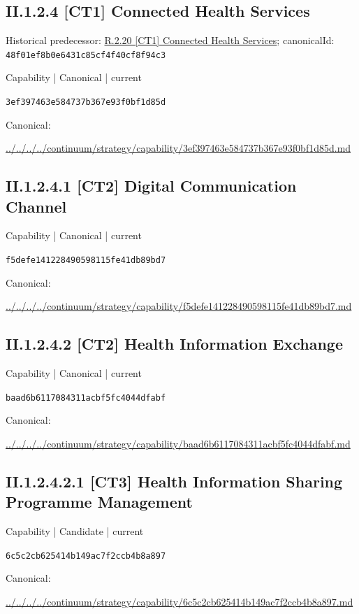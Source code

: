 \documentclass[10pt,a4paper]{article}
\begin{document}
\subsection*{II.1.2.4 [CT1] Connected Health Services}
Historical predecessor: \hyperref[element-48f01ef8b0e6431c85cf4f40cf8f94c3]{R.2.20 [CT1] Connected Health Services}; canonicalId: \texttt{48f01ef8b0e6431c85cf4f40cf8f94c3}\par
\label{element-3ef397463e584737b367e93f0bf1d85d}
{\small Capability | Canonical | current}\par
\texttt{3ef397463e584737b367e93f0bf1d85d}\par
Canonical: \par
{\footnotesize\url{../../../../continuum/strategy/capability/3ef397463e584737b367e93f0bf1d85d.md}}\par
\subsection*{II.1.2.4.1 [CT2] Digital Communication Channel}
\label{element-f5defe141228490598115fe41db89bd7}
{\small Capability | Canonical | current}\par
\texttt{f5defe141228490598115fe41db89bd7}\par
Canonical: \par
{\footnotesize\url{../../../../continuum/strategy/capability/f5defe141228490598115fe41db89bd7.md}}\par
\subsection*{II.1.2.4.2 [CT2] Health Information Exchange}
\label{element-baad6b6117084311acbf5fc4044dfabf}
{\small Capability | Canonical | current}\par
\texttt{baad6b6117084311acbf5fc4044dfabf}\par
Canonical: \par
{\footnotesize\url{../../../../continuum/strategy/capability/baad6b6117084311acbf5fc4044dfabf.md}}\par
\subsection*{II.1.2.4.2.1 [CT3] Health Information Sharing Programme Management}
\label{element-6c5c2cb625414b149ac7f2ccb4b8a897}
{\small Capability | Candidate | current}\par
\texttt{6c5c2cb625414b149ac7f2ccb4b8a897}\par
Canonical: \par
{\footnotesize\url{../../../../continuum/strategy/capability/6c5c2cb625414b149ac7f2ccb4b8a897.md}}\par
\end{document}
